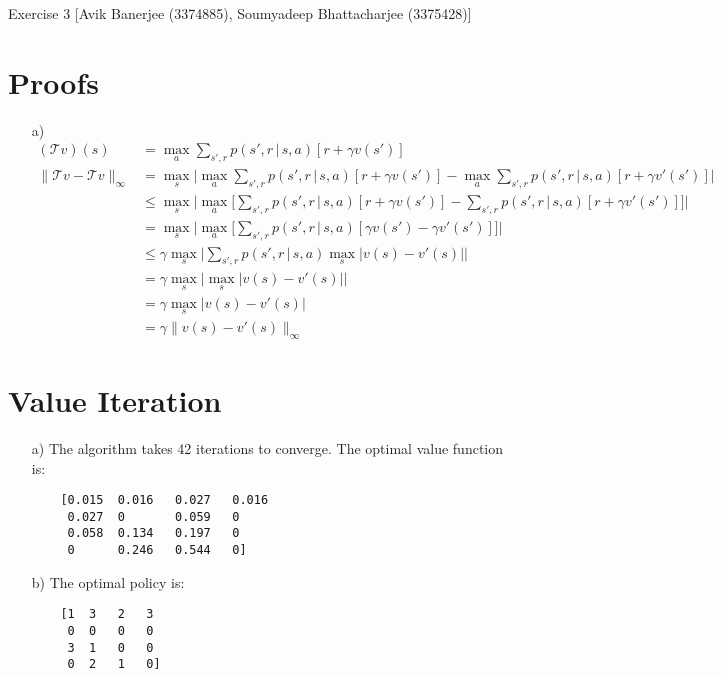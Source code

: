 \documentclass{article}
\begin{document}
\begin{center}
	{\LARGE Exercise 3}\linebreak
	{\large [Avik Banerjee (3374885), Soumyadeep Bhattacharjee (3375428)]}
\end{center}
\section{Proofs}
\begin{enumerate}
	\item[a)]
	\begin{equation*}
	\begin{split}
	(\mathcal{T} v)(s) &= \max_a \sum_{s', r} p(s',r\, | \, s,a)[r + \gamma v(s')]\\
	\parallel \mathcal{T}v - \mathcal{T}v\parallel_{\infty} &= \max_s \bigg|\max_a \sum_{s', r} p(s',r\, | \, s,a)[r + \gamma v(s')] - \max_a \sum_{s', r} p(s',r\, | \, s,a)[r + \gamma v'(s')]\bigg|\\
	&\leq \max_s \bigg|\max_a \bigg[\sum_{s', r} p(s',r\, | \, s,a)[r + \gamma v(s')] - \sum_{s', r} p(s',r\, | \, s,a)[r + \gamma v'(s')]\bigg]\bigg|\\
	&= \max_s\bigg|\max_a\bigg[\sum_{s', r}p(s',r\, | \, s,a)[\gamma v(s') - \gamma v'(s')]\bigg]\bigg|\\
	&\leq\gamma\max_s\bigg|\sum_{s', r}p(s',r\, | \, s,a)\max_{s}\big|v(s) - v'(s)\big|\bigg|\\
	&= \gamma \max_s\bigg|\max_s\big|v(s)-v'(s)\big|\bigg|\\
	&= \gamma \max_s\big|v(s) - v'(s)\big|\\
	&= \gamma \parallel v(s)-v'(s)\parallel_{\infty}
	\end{split}
	\end{equation*}
\end{enumerate}
\section{Value Iteration}
\begin{enumerate}
	\item[a)] The algorithm takes 42 iterations to converge. The optimal value function is:
	\begin{verbatim}
	[0.015	0.016	0.027	0.016
	 0.027	0	    0.059	0
	 0.058	0.134	0.197	0
	 0	    0.246	0.544	0]
	\end{verbatim}
	\item[b)] The optimal policy is:
	\begin{verbatim}
	[1	3	2	3
	 0	0	0	0
	 3	1	0	0
	 0	2	1	0]
	\end{verbatim}
\end{enumerate}
\end{document}
